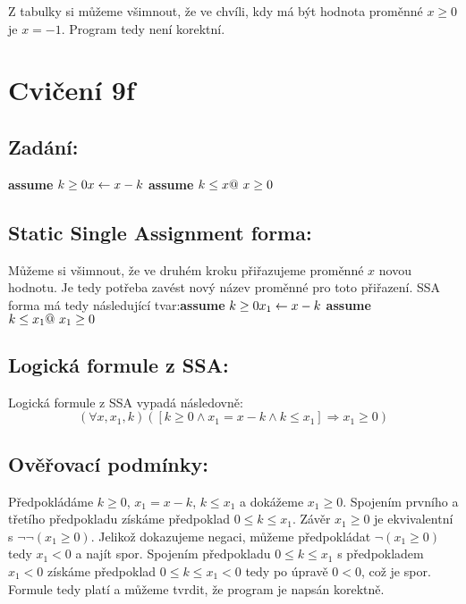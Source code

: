 \documentclass{article}
\begin{document}
Z tabulky si můžeme všimnout, že ve chvíli, kdy má být hodnota proměnné $x \geq 0$ je $x = -1$. Program tedy není korektní.

\section{Cvičení 9f}

\subsection{Zadání:}
\textbf{assume} $ k \geq 0 \newline x \leftarrow x - k \newline$ \textbf{assume} $k \leq x \newline @ \ x \geq 0$

\subsection{Static Single Assignment forma:}
Můžeme si všimnout, že ve druhém kroku přiřazujeme proměnné $x$ novou hodnotu. Je tedy potřeba zavést nový název proměnné pro toto přiřazení. SSA forma má tedy následující tvar:\newline\newline \textbf{assume} $k \geq 0 \newline x_1 \leftarrow x - k \newline $ \textbf{assume} $ k \leq x_1 \newline @ \ x_1 \geq 0$

\subsection{Logická formule z SSA:}
Logická formule z SSA vypadá následovně:
$$ (\forall x, x_1, k)([k \geq 0 \wedge x_1 = x - k \wedge k \leq x_1] \Rightarrow x_1 \geq 0) $$

\subsection{Ověřovací podmínky:}
Předpokládáme $k \geq 0$, $x_1 = x - k$, $k \leq x_1$ a dokážeme $x_1 \geq 0$. Spojením prvního a třetího předpokladu získáme předpoklad $0 \leq k \leq x_1$. Závěr $x_1 \geq 0$ je ekvivalentní s $\neg \neg (x_1 \geq 0)$. Jelikož dokazujeme negaci, můžeme předpokládat $\neg (x_1 \geq 0)$ tedy $x_1 < 0$ a najít spor. Spojením předpokladu $0 \leq k \leq x_1$ s předpokladem $x_1 < 0$ získáme předpoklad $0 \leq k \leq x_1 < 0$ tedy po úpravě $0 < 0$, což je spor. Formule tedy platí a můžeme tvrdit, že program je napsán korektně.
\end{document}
